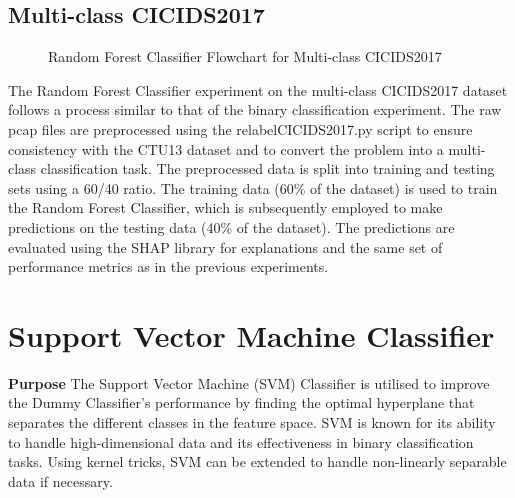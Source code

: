 \subsection{Multi-class CICIDS2017}
\begin{figure}[H]
\centering
{}
\caption{Random Forest Classifier Flowchart for Multi-class CICIDS2017}\label{fig:RandomForestFlowMultiCICIDS2017}
\end{figure}

The Random Forest Classifier experiment on the multi-class CICIDS2017 dataset follows a process similar to that of the binary classification experiment. The raw pcap files are preprocessed using the relabelCICIDS2017.py script to ensure consistency with the CTU13 dataset and to convert the problem into a multi-class classification task. The preprocessed data is split into training and testing sets using a 60/40 ratio. The training data (60\% of the dataset) is used to train the Random Forest Classifier, which is subsequently employed to make predictions on the testing data (40\% of the dataset). The predictions are evaluated using the SHAP library for explanations and the same set of performance metrics as in the previous experiments.

\section{Support Vector Machine Classifier}\label{sec:SVMClassifier}
\textbf{Purpose} The Support Vector Machine (SVM) Classifier is utilised to improve the Dummy Classifier's performance by finding the optimal hyperplane that separates the different classes in the feature space. SVM is known for its ability to handle high-dimensional data and its effectiveness in binary classification tasks. Using kernel tricks, SVM can be extended to handle non-linearly separable data if necessary.

